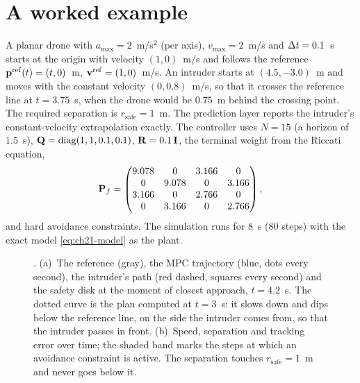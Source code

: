 \section{A worked example}
\label{sec:ch21-example}

\begin{example}
\label{ex:ch21-crossing}
A planar drone with $a_{\max}=2$~m/s$^2$ (per axis), $v_{\max}=2$~m/s and
$\Delta t=0.1$~s starts at the origin with velocity $(1,0)$~m/s and follows the
reference $\mathbf{p}^{\mathrm{ref}}(t)=(t,0)$~m, $\mathbf{v}^{\mathrm{ref}}=(1,0)$~m/s.
An intruder starts at $(4.5,-3.0)$~m and moves with the constant velocity
$(0,0.8)$~m/s, so that it crosses the reference line at $t=3.75$~s, when the
drone would be $0.75$~m behind the crossing point. The required separation is
$r_{\mathrm{safe}}=1$~m. The prediction layer reports the intruder's
constant-velocity extrapolation exactly. The controller uses $N=15$
(a horizon of $1.5$~s), $\mathbf{Q}=\operatorname{diag}(1,1,0.1,0.1)$, $\mathbf{R}=0.1\,\mathbf{I}$,
the terminal weight from the Riccati equation,
\begin{equation*}
\mathbf{P}_f=\begin{pmatrix}9.078&0&3.166&0\\0&9.078&0&3.166\\3.166&0&2.766&0\\0&3.166&0&2.766\end{pmatrix},
\end{equation*}
and hard avoidance constraints. The simulation runs for $8$~s
($80$ steps) with the exact model \cref{eq:ch21-model} as the plant.
\end{example}

\begin{figure}[tb]
  \centering
  \caption{. (a)~The reference (gray), the MPC
  trajectory (blue, dots every second), the intruder's path (red dashed,
  squares every second) and the safety disk at the moment of closest
  approach, $t=4.2$~s. The dotted curve is the plan computed at $t=3$~s: it
  slows down and dips below the reference line, on the side the intruder
  comes from, so that the intruder passes in front. (b)~Speed, separation and
  tracking error over time; the shaded band marks the steps at which an
  avoidance constraint is active. The separation touches
  $r_{\mathrm{safe}}=1$~m and never goes below it.}
  \label{fig:ch21-example}
\end{figure}

